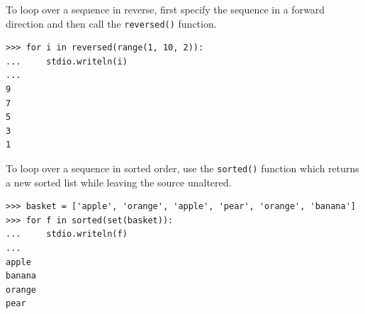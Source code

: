 \documentclass[8pt,a4paper,compress,handout]{beamer}
\begin{document}
\begin{frame}[fragile]
To loop over a sequence in reverse, first specify the sequence in a forward direction and then call the \lstinline{reversed()} function.
\begin{lstlisting}[language={}]
>>> for i in reversed(range(1, 10, 2)):
...     stdio.writeln(i)
...
9
7
5
3
1
\end{lstlisting}

\bigskip

To loop over a sequence in sorted order, use the \lstinline{sorted()} function which returns a new sorted list while leaving the source unaltered.
\begin{lstlisting}[language={}]
>>> basket = ['apple', 'orange', 'apple', 'pear', 'orange', 'banana']
>>> for f in sorted(set(basket)):
...     stdio.writeln(f)
...
apple
banana
orange
pear
\end{lstlisting}
\end{frame}
\end{document}
